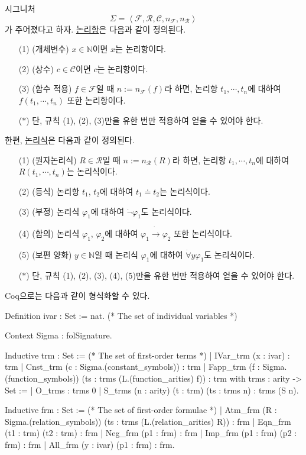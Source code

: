 \documentclass[12pt]{paper}
\begin{document}
시그니처 $$\Sigma = \left\langle \mathcal{F}, \mathcal{R}, \mathcal{C}, n_\mathcal{F} , n_\mathcal{R} \right\rangle$$가 주어졌다고 하자.
\underline{논리항}은 다음과 같이 정의된다.
\begin{enumerate}
\item [(1)] (개체변수) $x \in \mathbb{N}$이면 $x$는 논리항이다.
\item [(2)] (상수) $c \in \mathcal{C}$이면 $c$는 논리항이다.
\item [(3)] (함수 적용) $f \in \mathcal{F}$일 때 $n := n_\mathcal{F} \left( f \right)$라 하면, 논리항 $t_1, \cdots , t_n$에 대하여 $f \left( t_1 , \cdots , t_n \right)$ 또한 논리항이다.
\item [($\ast$)] 단, 규칙 (1), (2), (3)만을 유한 번만 적용하여 얻을 수 있어야 한다.
\end{enumerate}
한편, \underline{논리식}은 다음과 같이 정의된다.
\begin{enumerate}
\item [(1)] (원자논리식) $R \in \mathcal{R}$일 때 $n := n_\mathcal{R} \left( R \right)$라 하면, 논리항 $t_1, \cdots , t_n$에 대하여 $R \left( t_1 , \cdots , t_n \right)$는 논리식이다.
\item [(2)] (등식) 논리항 $t_1$, $t_2$에 대하여 $t_1 \doteq t_2$는 논리식이다. 
\item [(3)] (부정) 논리식 $\varphi_1$에 대하여 $\dot\lnot \varphi_1$도 논리식이다.
\item [(4)] (함의) 논리식 $\varphi_1$, $\varphi_2$에 대하여 $\varphi_1 \dot\to \varphi_2$ 또한 논리식이다.
\item [(5)] (보편 양화) $y \in \mathbb{N}$일 때 논리식 $\varphi_1$에 대하여 $\dot\forall y \varphi_1$도 논리식이다.
\item [($\ast$)] 단, 규칙 (1), (2), (3), (4), (5)만을 유한 번만 적용하여 얻을 수 있어야 한다.
\end{enumerate}
Coq으로는 다음과 같이 형식화할 수 있다.
\begin{coqcode}
Definition ivar : Set := nat. (* The set of individual variables *)

Context {Sigma : folSignature}.

Inductive trm : Set := (* The set of first-order terms *)
  | IVar_trm (x : ivar) : trm
  | Cnst_trm (c : Sigma.(constant_symbols)) : trm
  | Fapp_trm (f : Sigma.(function_symbols)) (ts : trms (L.(function_arities) f)) : trm
with trms : arity -> Set :=
  | O_trms : trms 0
  | S_trms (n : arity) (t : trm) (ts : trms n) : trms (S n).

Inductive frm : Set := (* The set of first-order formulae *)
  | Atm_frm (R : Sigma.(relation_symbols)) (ts : trms (L.(relation_arities) R)) : frm
  | Eqn_frm (t1 : trm) (t2 : trm) : frm
  | Neg_frm (p1 : frm) : frm
  | Imp_frm (p1 : frm) (p2 : frm) : frm
  | All_frm (y : ivar) (p1 : frm) : frm.
\end{coqcode}
\end{document}
